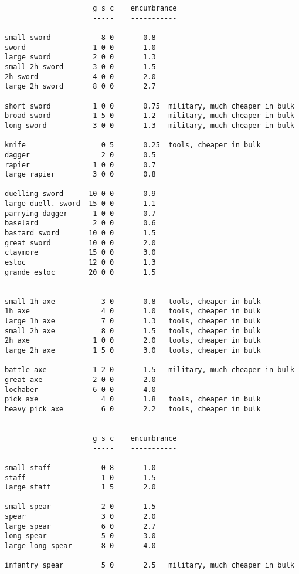 \begin{verbatim}
                     g s c    encumbrance
                     -----    -----------

small sword            8 0       0.8
sword                1 0 0       1.0
large sword          2 0 0       1.3
small 2h sword       3 0 0       1.5
2h sword             4 0 0       2.0
large 2h sword       8 0 0       2.7

short sword          1 0 0       0.75  military, much cheaper in bulk
broad sword          1 5 0       1.2   military, much cheaper in bulk
long sword           3 0 0       1.3   military, much cheaper in bulk

knife                  0 5       0.25  tools, cheaper in bulk
dagger                 2 0       0.5
rapier               1 0 0       0.7
large rapier         3 0 0       0.8

duelling sword      10 0 0       0.9
large duell. sword  15 0 0       1.1
parrying dagger      1 0 0       0.7
baselard             2 0 0       0.6
bastard sword       10 0 0       1.5
great sword         10 0 0       2.0
claymore            15 0 0       3.0
estoc               12 0 0       1.3
grande estoc        20 0 0       1.5


small 1h axe           3 0       0.8   tools, cheaper in bulk
1h axe                 4 0       1.0   tools, cheaper in bulk
large 1h axe           7 0       1.3   tools, cheaper in bulk
small 2h axe           8 0       1.5   tools, cheaper in bulk
2h axe               1 0 0       2.0   tools, cheaper in bulk
large 2h axe         1 5 0       3.0   tools, cheaper in bulk

battle axe           1 2 0       1.5   military, much cheaper in bulk
great axe            2 0 0       2.0
lochaber             6 0 0       4.0
pick axe               4 0       1.8   tools, cheaper in bulk
heavy pick axe         6 0       2.2   tools, cheaper in bulk


                     g s c    encumbrance
                     -----    -----------

small staff            0 8       1.0
staff                  1 0       1.5
large staff            1 5       2.0

small spear            2 0       1.5
spear                  3 0       2.0
large spear            6 0       2.7
long spear             5 0       3.0
large long spear       8 0       4.0

infantry spear         5 0       2.5   military, much cheaper in bulk


\end{verbatim}
